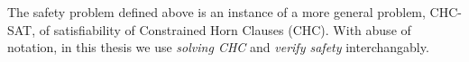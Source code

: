 The safety problem defined above is an instance of a more general problem,
CHC-SAT, of satisfiability of Constrained Horn Clauses (CHC). With abuse of notation, in this thesis we use \textit{solving CHC} and \textit{verify safety} interchangably.





